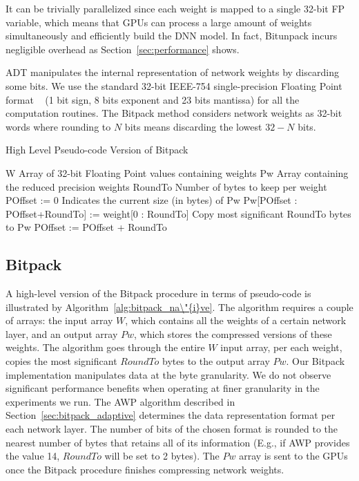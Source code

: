 It can be trivially parallelized since each weight is mapped
to a single 32-bit FP variable, which means that GPUs can process a
large amount of weights simultaneously and efficiently build the DNN model.
In fact, Bitunpack incurs negligible overhead as Section~\ref{sec:performance} shows.

ADT manipulates the internal representation of network weights by discarding some bits.
We use the standard 32-bit IEEE-754 single-precision Floating Point format
~\cite{ieee754} (1 bit sign, 8 bits exponent and 23 bits mantissa) for all the computation routines.
The Bitpack method considers network weights as 32-bit 
words where rounding to $N$ bits means discarding the lowest $32-N$ bits.

\begin{algorithm}%
\caption{High Level Pseudo-code Version of Bitpack}
\label{alg:bitpack_na\"{i}ve}
{\fontsize{11}{11}\selectfont
\begin{algorithmic}[1]
    \State W
    \Comment Array of 32-bit Floating Point values containing weights
    \State Pw
    \Comment Array containing the reduced precision weights
    \State RoundTo
    \Comment Number of bytes to keep per weight
    \State POffset := 0
    \Comment Indicates the current size (in bytes) of Pw
        \State Pw[POffset : POffset+RoundTo] := weight[0 : RoundTo]
        \Comment Copy most significant RoundTo bytes to Pw
        \State POffset := POffset + RoundTo
    \EndFor
\end{algorithmic}
}
\end{algorithm}


\subsection{Bitpack}
\label{subsec:bitpack}
A high-level version of the Bitpack procedure in terms of pseudo-code is illustrated by 
Algorithm~\ref{alg:bitpack_na\"{i}ve}.
The algorithm requires a couple of arrays: the input array $W$, which contains all the weights of a certain network layer, and an 
output array $Pw$, which stores the compressed versions of these weights. 
The algorithm goes through 
the entire $W$ input array, per each weight, copies the most 
significant $RoundTo$ bytes to the output array $Pw$.
Our Bitpack implementation manipulates data at the byte granularity.
We do not observe significant performance benefits when operating at finer granularity in the experiments we run.
The AWP algorithm described in Section~\ref{sec:bitpack_adaptive} determines the data representation format per each network layer.  
The number of bits of the chosen format is rounded to the nearest number of bytes
that retains all of its information (E.g., if AWP provides the value 14, $RoundTo$ will be set to 2 bytes).
The $Pw$ array is sent to the GPUs once the Bitpack procedure finishes compressing network weights.

